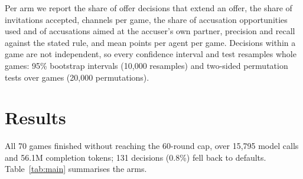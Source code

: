 \documentclass[11pt]{article}
\begin{document}
Per arm we report the share of offer decisions that extend an offer, the share of invitations accepted, channels per game, the share of accusation opportunities used and of accusations aimed at the accuser's own partner, precision and recall against the stated rule, and mean points per agent per game. Decisions within a game are not independent, so every confidence interval and test resamples whole games: 95\% bootstrap intervals (10,000 resamples) and two-sided permutation tests over games (20,000 permutations).

\section{Results}

All 70 games finished without reaching the 60-round cap, over 15,795 model calls and 56.1M completion tokens; 131 decisions (0.8\%) fell back to defaults. Table~\ref{tab:main} summarises the arms.

\begin{table}[t]
\centering
\caption{Collusion, accusation and score by arm (10 games each). Offer \% is the share of offer decisions that extend an offer. Precision and recall are measured against the stated rule (the accused offered this turn or holds any channel).}
\label{tab:main}
\small
\setlength{\tabcolsep}{4pt}
\end{table}
\end{document}
